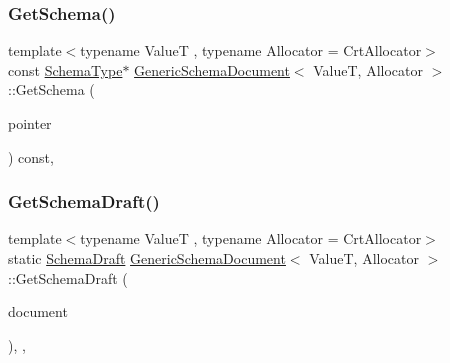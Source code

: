 \subsubsection{\texorpdfstring{Get\+Schema()}{GetSchema()}}
{\footnotesize\ttfamily template$<$typename ValueT , typename Allocator  = Crt\+Allocator$>$ \\
const \hyperlink{classGenericSchemaDocument_acaf115202b159a2eb72c97c3dc6c3895}{Schema\+Type}$\ast$ \hyperlink{classGenericSchemaDocument}{Generic\+Schema\+Document}$<$ ValueT, Allocator $>$\+::Get\+Schema (\begin{DoxyParamCaption}\item[{const \hyperlink{classGenericSchemaDocument_aeb62f562d4dc024402b00f97cbcef747}{Pointer\+Type} \&}]{pointer }\end{DoxyParamCaption}) const\hspace{0.3cm}{\ttfamily [inline]}, {\ttfamily [private]}}

\mbox{\label{classGenericSchemaDocument_ae7b00375e9c9e228e5c544296596070f}} 
\subsubsection{\texorpdfstring{Get\+Schema\+Draft()}{GetSchemaDraft()}}
{\footnotesize\ttfamily template$<$typename ValueT , typename Allocator  = Crt\+Allocator$>$ \\
static \hyperlink{schema_8h_a9804f9d7d7bd63131facb12bbeed41a9}{Schema\+Draft} \hyperlink{classGenericSchemaDocument}{Generic\+Schema\+Document}$<$ ValueT, Allocator $>$\+::Get\+Schema\+Draft (\begin{DoxyParamCaption}\item[{const \hyperlink{classGenericSchemaDocument_ae246f1b6573a5a8a2c0d73d4eb64d53a}{Value\+Type} \&}]{document }\end{DoxyParamCaption})\hspace{0.3cm}{\ttfamily [inline]}, {\ttfamily [static]}, {\ttfamily [private]}}

\mbox{\label{classGenericSchemaDocument_ab4a5e8f045c9d912e1078b55267174f9}} 

